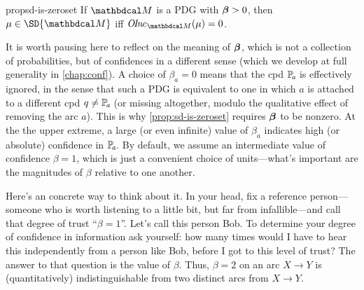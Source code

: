 \begin{linked}{prop}{sd-is-zeroset}
    If $\dg M$ is a PDG with $\boldsymbol\beta > 0$, then
	$\mu \in \SD{\dg M}$ iff  $\OInc_{\dg M}(\mu) = 0$.
\end{linked}

It is worth pausing here to reflect on the meaning of $\boldsymbol\beta$,
which is not a collection of probabilities, but of confidences in a different sense 
    (which we develop at full generality in \cref{chap:conf}).
%
A choice of $\beta_a = 0$ means that the cpd $\p_a$ is effectively ignored, in the sense that such a PDG is equivalent to one in which $a$ is attached to a different cpd $q \ne \p_a$ (or missing altogether, modulo the qualitative effect of removing the arc $a$).
This is why \cref{prop:sd-is-zeroset} requires $\boldsymbol\beta$ to be nonzero.
At the the upper extreme, a large (or even infinite) value of $\beta_a$ indicates high (or absolute) confidence in $\p_a$. 
By default, we assume an intermediate value of confidence $\beta = 1$, which is just a convenient choice of units---what’s important are the magnitudes of $\beta$ relative to one another.

Here's an concrete way to think about it.
In your head, fix a reference person---someone who is worth listening to a little bit, but far from infallible---and call that degree of trust ``$\beta = 1$''. 
Let's call this person Bob. 
To determine your degree of confidence in information
ask yourself: how many times would I have to hear this independently from a person like Bob, before I got to this level of trust? The answer to that question is the value of $\beta$. 
Thus, $\beta = 2$ on an arc $X \to Y$ is (quantitatively) indistinguishable from two distinct arcs from $X \to Y$. 

